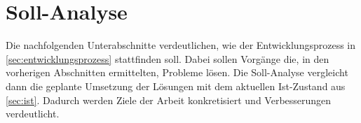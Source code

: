 \section{Soll-Analyse}\label{sec:soll}
Die nachfolgenden Unterabschnitte verdeutlichen, wie der Entwicklungsprozess in \autoref{sec:entwicklungsprozess} stattfinden soll.
Dabei sollen Vorgänge die, in den vorherigen Abschnitten ermittelten, Probleme lösen.
Die Soll-Analyse vergleicht dann die geplante Umsetzung der Lösungen mit dem aktuellen Ist-Zustand aus \autoref{sec:ist}. 
Dadurch werden Ziele der Arbeit konkretisiert und Verbesserungen verdeutlicht.

